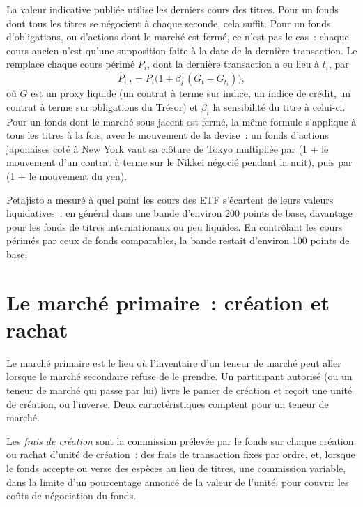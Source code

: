 La valeur indicative publiée utilise les derniers cours des titres. Pour un fonds dont tous les titres se négocient à chaque seconde, cela suffit. Pour un fonds
d'obligations, ou d'actions dont le marché est fermé, ce n'est pas le cas~: chaque cours ancien n'est qu'une supposition faite à la date de la dernière transaction. Le  remplace
chaque cours périmé $P_i$, dont la dernière transaction a eu lieu à $t_i$, par
\[
\hat P_{i,t}=P_i\bigl(1+\beta_i\,(G_t-G_{t_i})\bigr),
\]
où $G$ est un proxy liquide (un contrat à terme sur indice, un indice de crédit, un contrat à terme sur obligations du Trésor) et $\beta_i$ la sensibilité du titre à celui-ci. Pour un fonds dont
le marché sous-jacent est fermé, la même formule s'applique à tous les titres à la fois, avec le mouvement de la devise~: un fonds d'actions japonaises coté à New York
vaut sa clôture de Tokyo multipliée par (1 + le mouvement d'un contrat à terme sur le Nikkei négocié pendant la nuit), puis par (1 + le mouvement du yen).

Petajisto a mesuré à quel point les cours des ETF s'écartent de leurs valeurs liquidatives~: en général dans une bande d'environ 200 points de base, davantage pour les fonds de
titres internationaux ou peu liquides. En contrôlant les cours périmés par ceux de fonds comparables, la bande restait d'environ 100 points de base.

\section{Le marché primaire~: création et rachat}

Le marché primaire est le lieu où l'inventaire d'un teneur de marché peut aller lorsque le marché secondaire refuse de le prendre. Un participant autorisé (ou un
teneur de marché qui passe par lui) livre le panier de création et reçoit une unité de création, ou l'inverse. Deux caractéristiques comptent pour un teneur de marché.

\begin{definition}\label{def:hf:etf-market-making:fee}
Les \emph{frais de création} sont la commission prélevée par le fonds sur chaque création ou rachat d'unité de création~: des frais de transaction fixes par
ordre, et, lorsque le fonds accepte ou verse des espèces au lieu de titres, une commission variable, dans la limite d'un pourcentage annoncé de la valeur de l'unité, pour couvrir les
coûts de négociation du fonds.
\end{definition}

